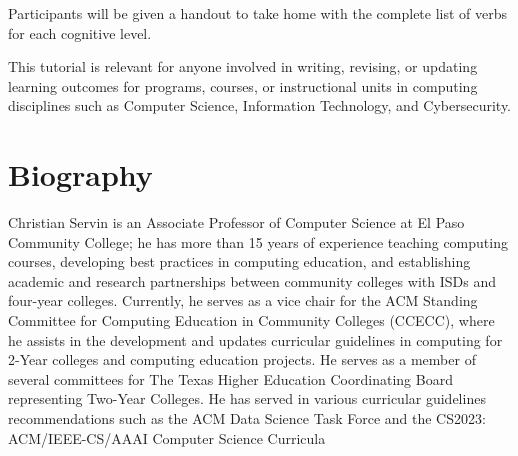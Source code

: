 \documentclass{article}
\begin{document}
	\noindent Participants will be given a handout to take home with the complete list of verbs for each cognitive level.
	
	\noindent This tutorial is relevant for anyone involved in writing, revising, or updating learning outcomes for programs, courses, or instructional units in computing disciplines such as Computer Science, Information Technology, and Cybersecurity.
	
\section*{Biography}
Christian Servin is an Associate Professor of Computer Science at El Paso Community College; he has more than 15 years of experience teaching computing courses, developing best practices in computing education, and establishing academic and research partnerships between community colleges with ISDs and four-year colleges. Currently, he serves as a vice chair for the ACM Standing Committee for Computing Education in Community Colleges (CCECC), where he assists in the development and updates curricular guidelines in computing for 2-Year colleges and computing education projects. He serves as a member of several committees for The Texas Higher Education Coordinating Board representing Two-Year Colleges. He has served in various curricular guidelines recommendations such as the ACM Data Science Task Force and the CS2023: ACM/IEEE-CS/AAAI Computer Science Curricula

\medskip

 


%
%	
\end{document}
